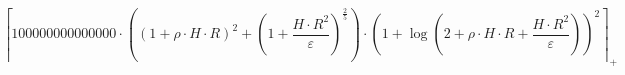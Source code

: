 \[\left\lceil 100000000000000 \cdot \left(\left(1 + \rho \cdot H \cdot R\right)^{2} + \left(1 + \frac{H \cdot R^{2}}{\varepsilon}\right)^{\frac{2}{5}}\right) \cdot \left(1 + \log\left(2 + \rho \cdot H \cdot R + \frac{H \cdot R^{2}}{\varepsilon}\right)\right)^{2} \right\rceil_{+}\]
